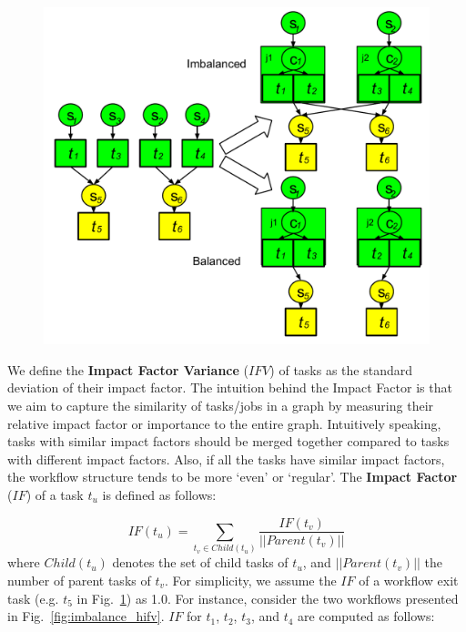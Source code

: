 \begin{figure}[htb]
	\centering
	\includegraphics[width=\linewidth]{figures/imbalance/dv.pdf}
	\label{fig:imbalance_dv}
\end{figure}

We define the \textbf{Impact Factor Variance} ($IFV$) of tasks as the standard deviation of their impact factor. The intuition behind the Impact Factor is that we aim to capture the similarity of tasks/jobs in a graph by measuring their relative impact factor or importance to the entire graph. Intuitively speaking, tasks with similar impact factors should be merged together compared to tasks with different impact factors. Also, if all the tasks have similar impact factors, the workflow structure tends to be more `even' or `regular'. The \textbf{Impact Factor} ($IF$) of a task $t_u$ is defined as follows:


\begin{equation}
\label{eq:imbalance_impact_factor}
	IF(t_u)=\sum_{t_v\in Child(t_u)}^{}\frac{IF(t_v)}{||Parent(t_v)||}
\end{equation}
where $Child(t_u)$ denotes the set of child tasks of $t_u$, and $||Parent(t_v)||$ the number of parent tasks of $t_v$. For simplicity, we assume the $IF$ of a workflow exit task (e.g. $t_5$ in Fig.~\ref{fig:imbalance_dv}) as 1.0. For instance, consider the two workflows presented in Fig.~\ref{fig:imbalance_hifv}. $IF$ for $t_1$, $t_2$, $t_3$, and $t_4$ are computed as follows:

